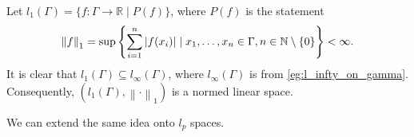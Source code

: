 \documentclass[notoc,notitlepage]{tufte-book}
\newcommand{\norm}[1]{\left\| #1 \right\|}
\begin{document}
\begin{eg}
  Let $l_1(\Gamma) = \{ f : \Gamma \to \mathbb{R} \mid P(f) \}$, where $P(f)$ is the statement
  \begin{equation*}
    \norm{f}_1 = \sup \left\{ \sum_{i=1}^{n} \abs{f(x_i)} \mid x_1, \ldots, x_n \in \Gamma, n \in \mathbb{N} \setminus \{ 0 \} \right\} < \infty.
  \end{equation*}
  It is clear that $l_1(\Gamma) \subseteq l_\infty(\Gamma)$, where $l_\infty(\Gamma)$ is from \cref{eg:l_infty_on_gamma}. Consequently, $(l_1(\Gamma), \norm\cdot_1)$ is a normed linear space.
\end{eg}

We can extend the same idea onto $l_p$ spaces.
\end{document}
